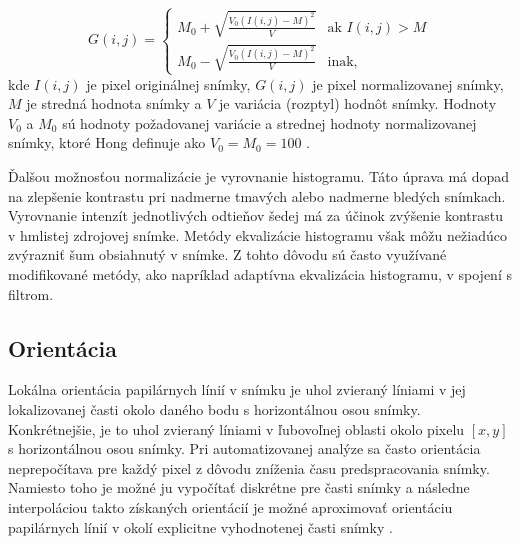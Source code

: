   \begin{equation}
    G(i,j) =
    \begin{cases}
      M_0 + \sqrt{\frac{V_0 (I(i,j)-M)^2}{V}}  & \text{ak } I(i,j) > M \\
      M_0 - \sqrt{\frac{V_0 (I(i,j)-M)^2}{V}} & \text{inak,}
    \end{cases}
    \label{eq:normalizacia_Hong}
  \end{equation}
  kde $I(i,j)$ je pixel originálnej snímky, $G(i,j)$ je pixel normalizovanej snímky, $M$ je stredná hodnota snímky a $V$ je variácia (rozptyl) hodnôt snímky.
  Hodnoty $V_0$ a $M_0$ sú hodnoty požadovanej variácie a strednej hodnoty normalizovanej snímky, ktoré Hong definuje ako $V_0 = M_0 = 100$ \cite{Hong}.

  Ďalšou možnosťou normalizácie je vyrovnanie histogramu. Táto úprava má dopad na zlepšenie kontrastu pri nadmerne tmavých
  alebo nadmerne bledých snímkach. Vyrovnanie intenzít jednotlivých odtieňov šedej má za účinok zvýšenie kontrastu v hmlistej zdrojovej snímke.
  Metódy ekvalizácie histogramu však môžu nežiadúco zvýrazniť šum obsiahnutý v snímke. Z tohto dôvodu sú často využívané modifikované metódy,
  ako napríklad adaptívna ekvalizácia histogramu, v spojení s filtrom.
  
  \subsection{Orientácia} \label{sec:orientacia}
  Lokálna orientácia papilárnych línií v snímku je uhol zvieraný líniami v jej lokalizovanej časti okolo daného bodu
  s horizontálnou osou snímky. Konkrétnejšie, je to uhol zvieraný líniami v ľubovoľnej oblasti okolo pixelu $[x,y]$ s
  horizontálnou osou snímky. Pri automatizovanej analýze sa často orientácia neprepočítava pre každý pixel z dôvodu zníženia času predspracovania snímky.
  Namiesto toho je možné ju vypočítať diskrétne pre časti snímky a následne interpoláciou takto získaných orientácií je možné aproximovať
  orientáciu papilárnych línií v okolí explicitne vyhodnotenej časti snímky \cite{Handbook}.

